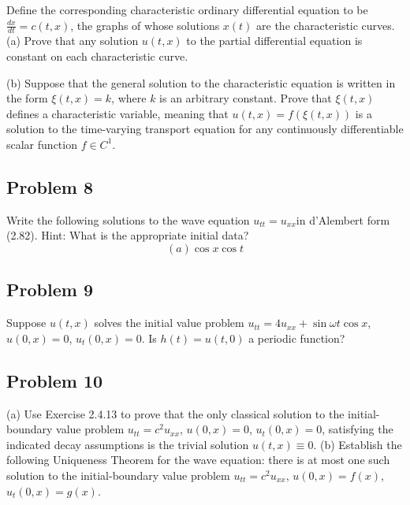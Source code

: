 \documentclass[letterpaper, 11pt]{article}
\newcommand{\1}{\mathds{1}}	%
\theoremstyle{definition}
\begin{document}
Define the corresponding characteristic ordinary differential equation to be $\frac{dx}{dt} = c(t,x)$, the graphs of whose solutions $x(t)$ are the characteristic curves. (a) Prove that any solution $u(t,x)$ to the partial differential equation is constant on each characteristic curve.

(b) Suppose that the general solution to the characteristic equation is written in the form $\xi(t,x) = k$, where $k$ is an arbitrary constant. Prove that $\xi(t,x)$ defines a characteristic variable, meaning that $u(t,x) = f(\xi(t,x))$ is a solution to the time-varying transport equation for any continuously differentiable scalar function $f \in C^1$.


\vspace{14cm}
\subsection*{Problem 8}
Write the following solutions to the wave equation $u_{tt} = u_{xx} $in d'Alembert form (2.82). Hint: What is the appropriate initial data?
$$
   (a) \cos{x} \cos{t} 
$$ 

\vspace{7cm}
\subsection*{Problem 9}
Suppose $u(t,x)$ solves the initial value problem $u_{tt}=4u_{xx}+\sin\omega t\cos x$, $u(0,x)=0$, $u_t(0,x)=0$. Is $h(t)=u(t,0)$ a periodic function?
\vspace{8cm}
\subsection*{Problem 10}
(a) Use Exercise 2.4.13 to prove that the only classical solution to the initial-boundary value problem $u_{tt}=c^{2}u_{xx}$, $u(0,x)=0$, $u_{t}(0,x)=0$, satisfying the indicated decay assumptions is the trivial solution $u(t,x)\equiv 0$. (b) Establish the following Uniqueness Theorem for the wave equation: there is at most one such solution to the initial-boundary value problem $u_{tt}=c^{2}u_{xx}$, $u(0,x)=f(x)$, $u_{t}(0,x)=g(x)$.
\end{document}
